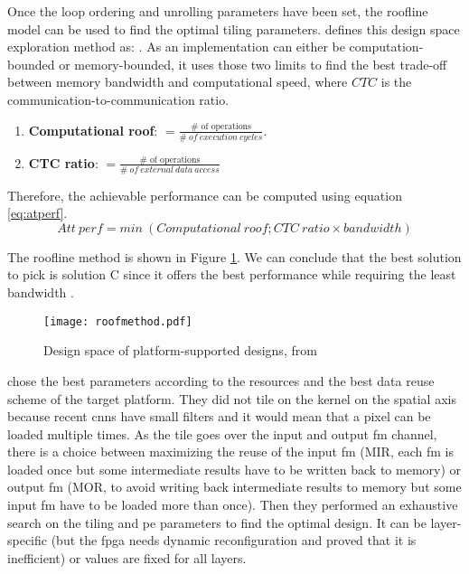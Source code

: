 Once the loop ordering and unrolling parameters have been set, the roofline model can be used to find the optimal tiling parameters. \textcite{mittal_survey_2020} defines this design space exploration method as: . As an implementation can either be computation-bounded or memory-bounded, it uses those two limits to find the best trade-off between memory bandwidth and computational speed, where $CTC$ is the communication-to-communication ratio.
\begin{enumerate}
    \item \textbf{Computational roof}: $= \frac{\text{\# \ of \ operations}}{\# \ of \ execution \ cycles}$.
    \item \textbf{CTC ratio}: $= \frac{\text{\# \ of \ operations}}{\# \ of \ external \ data \ access}$
\end{enumerate}
Therefore, the achievable performance can be computed using equation \ref{eq:atperf}.
\begin{equation}
Att \ perf = min \ (Computational \ roof; CTC \ ratio \times bandwidth)
\label{eq:atperf}
\end{equation}

The roofline method is shown in Figure \ref{fig:roofmeth}. We can conclude that the best solution to pick is solution C since it offers the best performance while requiring the least bandwidth \cite{zhang_optimizing_2015}.
%
\begin{figure}[H]
    \centering
    \texttt{[image: roofmethod.pdf]}
    \caption{Design space of platform-supported designs, from \cite{zhang_optimizing_2015}}
    \label{fig:roofmeth}
\end{figure}

\textcite{motamedi_placid_2017} chose the best parameters according to the resources and the best data reuse scheme of the target platform. They did not tile on the kernel on the spatial axis because recent \acrshort{cnn}s have small filters and it would mean that a pixel can be loaded multiple times. As the tile goes over the input and output \acrshort{fm} channel, there is a choice between maximizing the reuse of the input \acrshort{fm} (MIR, each \acrshort{fm} is loaded once but some intermediate results have to be written back to memory) or output \acrshort{fm} (MOR, to avoid writing back intermediate results to memory but some input \acrshort{fm} have to be loaded more than once). Then they performed an exhaustive search on the tiling and \acrshort{pe} parameters to find the optimal design. It can be layer-specific (but the \acrshort{fpga} needs dynamic reconfiguration and \textcite{zhang_optimizing_2015} proved that it is inefficient) or values are fixed for all layers.

